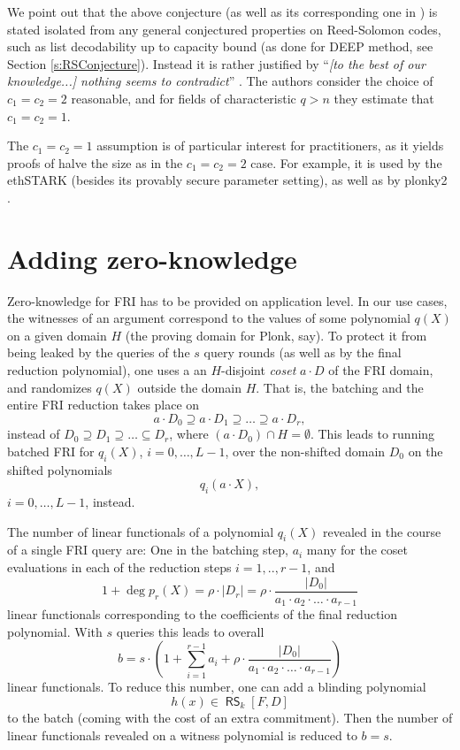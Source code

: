 \documentclass[11pt,article,oneside]{memoir}
\theoremstyle{definition}
\theoremstyle{remark}
\DeclareMathOperator{\RS}{\mathsf{RS}}
\begin{document}
We point out that the above conjecture (as well as its corresponding one in \cite{FRI}) is stated isolated from any general conjectured properties on Reed-Solomon codes, such as list decodability up to capacity bound (as done for DEEP method, see Section \ref{s:RSConjecture}). 
Instead it is rather justified by “\textit{[to the best of our knowledge...] nothing seems to contradict}” .
The authors consider the choice of $c_1=c_2=2$ reasonable, and for fields of characteristic $q>n$ they estimate that $c_1=c_2=1$. 

The $c_1=c_2=1$ assumption is of particular interest for practitioners, as it yields proofs of halve the size as in the $c_1=c_2=2$ case. For example, it is used by the ethSTARK \cite{ethSTARK} (besides its provably secure parameter setting), as well as by plonky2 \cite{PolygonZero}.


\section{Adding zero-knowledge}

Zero-knowledge for FRI has to be provided on application level. 
In our use cases, the witnesses of an argument correspond to the values of some polynomial $q(X)$ on a given domain $H$ (the proving domain for Plonk, say). 
To protect it from being leaked by the queries of the $s$ query rounds (as well as by the final reduction polynomial), one uses a an $H$-disjoint \textit{coset} $a\cdot D$ of the FRI domain, and randomizes $q(X)$ outside the domain $H$. 
That is, the batching and the entire FRI reduction takes place on 
\[
a\cdot D_0\supseteq a\cdot D_1 \supseteq \ldots \supseteq a\cdot D_{r}, 
\]
instead of $D_0\supseteq D_1 \supseteq \ldots \subseteq D_r$, where $(a\cdot D_0) \cap H=\emptyset$.
This leads to running batched FRI for $q_i(X)$, $i=0,\ldots, L-1$, over the non-shifted domain $D_0$ on the shifted polynomials
\[
q_i(a\cdot X), 
\]
$i=0,\ldots,L-1$, instead.

The number of linear functionals of a polynomial $q_i(X)$ revealed in the course of a single FRI query are:  
One in the batching step, $a_i$ many for the coset evaluations in each of the reduction steps $i=1,..,r-1$, and 
\[
1+ \deg p_r(X) = \rho\cdot |D_r| =  \rho\cdot\frac{ |D_0|}{a_1\cdot a_2\cdot \ldots \cdot a_{r-1}}
\] 
linear functionals corresponding to the coefficients of the final reduction polynomial.
With $s$ queries this leads to overall
\begin{equation}
b=s\cdot (1+ \sum_{i=1}^{r-1} a_i + \rho\cdot \frac{|D_0|}{a_1\cdot a_2\cdot \ldots \cdot a_{r-1}})
\end{equation}
linear functionals. To reduce this number, one can add a blinding polynomial 
\[
h(x) \in \RS_k[F,D] 
\]
to the batch (coming with the cost of an extra commitment). 
Then the number of linear functionals revealed on a witness polynomial is reduced to $b= s$. 
\end{document}
